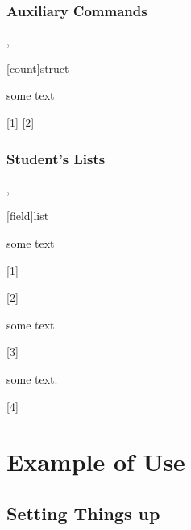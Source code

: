 \documentclass[10pt]{article}
\begin{document}
\subsubsection{Auxiliary Commands}
\begin{codedescribe}{\emptytermifnone,\emptyfields}
  \begin{codesyntax}
    \tsmacro{\emptytermifnone}[count]{struct}
    \tsmacro{\emptyfields}{}
  \end{codesyntax}
  some text
\end{codedescribe}

[1]
[2]



\subsubsection{Student's Lists}
\begin{codedescribe}{\studentaddtolist,\studentlistsort}
\begin{codesyntax}
  \tsmacro{\studentlistsort}[field]{list}
\end{codesyntax}
some text
\end{codedescribe}

[1]

[2]

\begin{codedescribe}{\listemptytermsifnone}
\begin{codesyntax}
\end{codesyntax}
some text.  
\end{codedescribe}

[3]


\begin{codedescribe}{\studentlistiterate}
\begin{codesyntax}
\end{codesyntax}
some text.  
\end{codedescribe}

[4]


\section{Example of Use}
\subsection{Setting Things up}
\end{document}
